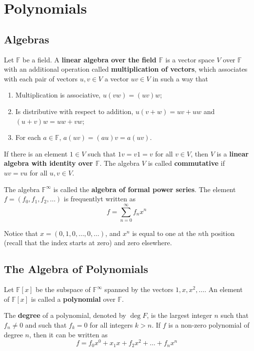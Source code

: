 \chapter{Polynomials}

\section{Algebras}

\begin{definition}
	Let $\mathbb{F}$ be a field. A \textbf{linear algebra over the field $\mathbb{F}$} is a vector space $V$ over $\mathbb{F}$ with an additional operation called \textbf{multiplication of vectors}, which associates with each pair of vectors $u, v \in V$ a vector $uv \in V$ in such a way that 
	\begin{enumerate}
		\item Multiplication is associative, $u(vw) = (uv)w$;
		\item Is distributive with respect to addition, $u(v+w) = uv + uw$ and $(u+v)w = uw + vw$;
		\item For each $a \in \mathbb{F}$, $a(uv) = (au)v = a(uv)$.
	\end{enumerate}
	
	If there is an element $1 \in V$ such that $1v = v1 = v$ for all $v \in V$, then $V$ is a \textbf{linear algebra with identity over $\mathbb{F}$}. The algebra $V$ is called \textbf{commutative} if $uv = vu$ for all $u,v \in V$.
\end{definition}

\begin{example}
	The algebra $\mathbb{F}^\infty$ is called the \textbf{algebra of formal power series}. The element $f = (f_0, f_1, f_2, \ldots)$ is frequentlyt written as
	\[
		f = \sum_{n=0}^\infty f_n x^n
	\]
	
	Notice that $x = (0,1,0,\ldots,0,\ldots)$, and $x^n$ is equal to one at the $n$th position (recall that the index starts at zero) and zero elsewhere. 
\end{example}

\section{The Algebra of Polynomials}

\begin{definition}[Polynomial]
	Let $\mathbb{F}[x]$ be the subspace of $\mathbb{F}^\infty$ spanned by the vectors $1, x, x^2, \ldots$. An element of $\mathbb{F}[x]$ is called a \textbf{polynomial} over $\mathbb{F}$.
	
	The \textbf{degree} of a polynomial, denoted by $\deg F$, is the largest integer $n$ such that $f_n \neq 0$ and such that $f_k = 0$ for all integers $k > n$. If $f$ is a non-zero polynomial of degree $n$, then it can be written as
	\[
		f = f_0 x^0 + x_1 x + f_2 x^2 + \ldots + f_n x^n
	\]
\end{definition}


